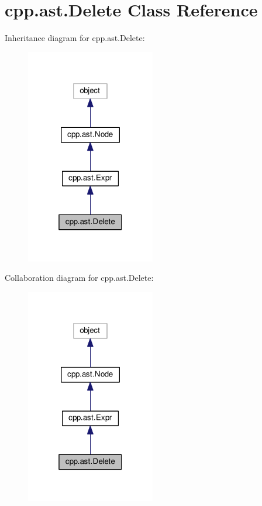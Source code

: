 \hypertarget{classcpp_1_1ast_1_1_delete}{}\section{cpp.\+ast.\+Delete Class Reference}
\label{classcpp_1_1ast_1_1_delete}


Inheritance diagram for cpp.\+ast.\+Delete\+:
\nopagebreak
\begin{figure}[H]
\begin{center}
\leavevmode
\includegraphics[width=160pt]{classcpp_1_1ast_1_1_delete__inherit__graph}
\end{center}
\end{figure}


Collaboration diagram for cpp.\+ast.\+Delete\+:
\nopagebreak
\begin{figure}[H]
\begin{center}
\leavevmode
\includegraphics[width=160pt]{classcpp_1_1ast_1_1_delete__coll__graph}
\end{center}
\end{figure}
